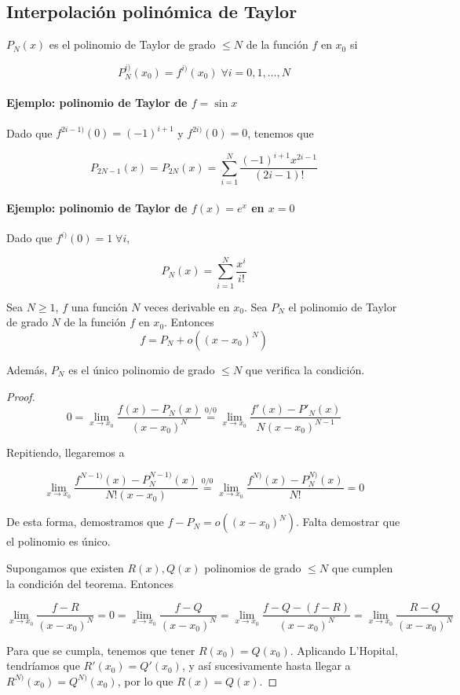 \documentclass[nochap]{apuntes}
\begin{document}
\subsection{Interpolación polinómica de Taylor}

\begin{defn}
$P_N(x)$ es el polinomio de Taylor de grado $≤N$ de la función $f$ en $x_0$ si 

\[ P_N^{i)}(x_0) = f^{i)}(x_0)\;\forall i = 0, 1,\dotsc, N\]
\end{defn}

\paragraph{Ejemplo: polinomio de Taylor de $f=\sin x$}
Dado que $f^{2i-1)}(0) = (-1)^{i+1}$ y $f^{2i)}(0) = 0$, tenemos que 

\[ P_{2N-1}(x) = P_{2N}(x) = \sum_{i=1}^N\frac{(-1)^{i+1}x^{2i-1}}{(2i-1)!} \]

\paragraph{Ejemplo: polinomio de Taylor de $f(x) = e^x$ en $x=0$}
Dado que $f^{i)}(0)=1\;\forall i$, 

\[ P_N(x) = \sum_{i=1}^N\frac{x^i}{i!} \]

\begin{theorem}
Sea $N≥1$, $f$ una función $N$ veces derivable en $x_0$. Sea $P_N$ el polinomio de Taylor de grado $N$ de la función $f$ en $x_0$. Entonces
\[ f = P_N + o\left((x-x_0)^N\right) \]

Además, $P_N$ es el único polinomio de grado $≤N$ que verifica la condición.
\end{theorem}

\begin{proof}
\[
0 = \lim_{x\to x_0} \frac{f(x) - P_N(x)}{(x-x_0)^N} \overset{0/0}{=} \lim_{x\to x_0} \frac{f'(x)-P'_N(x)}{N(x-x_0)^{N-1}}
\]

Repitiendo, llegaremos a 

\[ \lim_{x\to x_0} \frac{f^{N-1)}(x) - P^{N-1)}_N(x)}{N!(x-x_0)}  \overset{0/0}{=} \lim_{x\to x_0} \frac{f^{N)}(x) - P^{N)}_N(x)}{N!} = 0 \]

De esta forma, demostramos que $f-P_N = o\left((x-x_0)^N\right)$. Falta demostrar que el polinomio es único.

Supongamos que existen $R(x), Q(x)$ polinomios de grado $≤N$ que cumplen la condición del teorema. Entonces

\[
\lim_{x\to x_0} \frac{f -R}{(x-x_0)^N} = 0 = \lim_{x\to x_0} \frac{f - Q}{(x-x_0)^N} = \lim_{x\to x_0} \frac{f - Q - (f - R)}{(x-x_0)^N} = \lim_{x\to x_0} \frac{R - Q}{(x-x_0)^N} 
\]

Para que se cumpla, tenemos que tener $R(x_0) = Q(x_0)$. Aplicando L'Hopital, tendríamos que $R'(x_0)=Q'(x_0)$, y así sucesivamente hasta llegar a $R^{N)}(x_0) = Q^{N)}(x_0)$, por lo que $R(x) = Q(x)$.
\end{proof}
\end{document}
